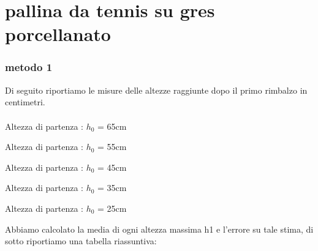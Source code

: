 \documentclass[a4paper]{article}
\theoremstyle{definition}
\begin{document}
	\section*{pallina da tennis su gres porcellanato}
	\subsubsection*{metodo 1}
	\noindent Di seguito riportiamo le misure delle altezze raggiunte dopo il primo rimbalzo in centimetri.\\\\
Altezza di partenza : \(h_{0}\) = 65cm

\begin{table}[!ht]
	\centering
	
\end{table}
\noindent Altezza di partenza : \(h_{0}\) = 55cm

\begin{table}[!ht]
	\centering
	
\end{table}
\noindent	Altezza di partenza : \(h_{0}\) = 45cm

\begin{table}[!ht]
	\centering
	
\end{table}
\noindent	Altezza di partenza : \(h_{0}\) = 35cm

\begin{table}[!ht]
	\centering
	
\end{table}
\noindent	Altezza di partenza : \(h_{0}\) = 25cm

\begin{table}[!ht]
	\centering
	
\end{table}

\noindent Abbiamo calcolato la media di ogni altezza massima h1 e l'errore su tale stima, di sotto riportiamo una tabella riassuntiva:\\
\end{document}
